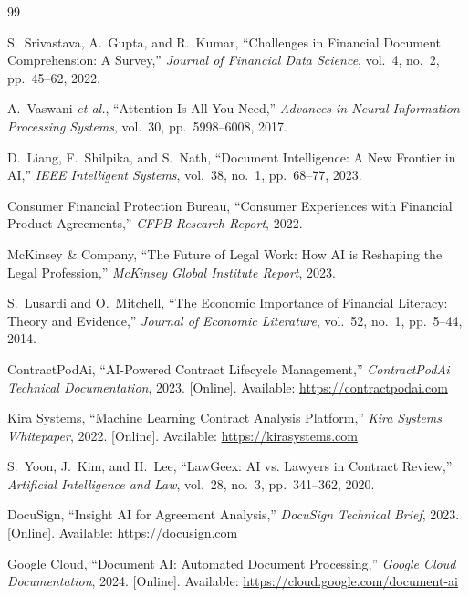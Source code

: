 \documentclass[12pt,a4paper,oneside]{report}
\begin{document}
\newpage
\begin{thebibliography}{99}

 S.~Srivastava, A.~Gupta, and R.~Kumar, ``Challenges in Financial Document Comprehension: A Survey,'' \textit{Journal of Financial Data Science}, vol.~4, no.~2, pp.~45--62, 2022.

 A.~Vaswani \textit{et al.}, ``Attention Is All You Need,'' \textit{Advances in Neural Information Processing Systems}, vol.~30, pp.~5998--6008, 2017.

 D.~Liang, F.~Shilpika, and S.~Nath, ``Document Intelligence: A New Frontier in AI,'' \textit{IEEE Intelligent Systems}, vol.~38, no.~1, pp.~68--77, 2023.

 Consumer Financial Protection Bureau, ``Consumer Experiences with Financial Product Agreements,'' \textit{CFPB Research Report}, 2022.

 McKinsey \& Company, ``The Future of Legal Work: How AI is Reshaping the Legal Profession,'' \textit{McKinsey Global Institute Report}, 2023.

 S.~Lusardi and O.~Mitchell, ``The Economic Importance of Financial Literacy: Theory and Evidence,'' \textit{Journal of Economic Literature}, vol.~52, no.~1, pp.~5--44, 2014.

 ContractPodAi, ``AI-Powered Contract Lifecycle Management,'' \textit{ContractPodAi Technical Documentation}, 2023. [Online]. Available: \url{https://contractpodai.com}

 Kira Systems, ``Machine Learning Contract Analysis Platform,'' \textit{Kira Systems Whitepaper}, 2022. [Online]. Available: \url{https://kirasystems.com}

 S.~Yoon, J.~Kim, and H.~Lee, ``LawGeex: AI vs. Lawyers in Contract Review,'' \textit{Artificial Intelligence and Law}, vol.~28, no.~3, pp.~341--362, 2020.

 DocuSign, ``Insight AI for Agreement Analysis,'' \textit{DocuSign Technical Brief}, 2023. [Online]. Available: \url{https://docusign.com}

 Google Cloud, ``Document AI: Automated Document Processing,'' \textit{Google Cloud Documentation}, 2024. [Online]. Available: \url{https://cloud.google.com/document-ai}


\end{thebibliography}
\end{document}
